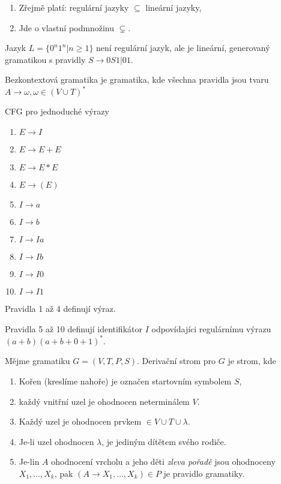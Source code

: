 \documentclass[../main.tex]{subfiles}
\begin{document}
\begin{enumerate}
    \item Zřejmě platí: regulární jazyky $\subseteq$ lineární jazyky,
    \item Jde o vlastní podmnožinu $\subsetneq$.
\end{enumerate}

\begin{example}
    Jazyk $L = \{0^n1^n | n \geq 1\}$ není regulární jazyk, ale je lineární, generovaný gramatikou s pravidly $S \rightarrow 0S1|01$.
\end{example}

\begin{definition}
    Bezkontextová gramatika je gramatika, kde všechna pravidla jsou tvaru $A \rightarrow \omega, \omega \in (V\cup T)^*$

    CFG pro jednoduché výrazy
    \begin{enumerate}
        \item $E \rightarrow I$
        \item $E \rightarrow E + E$
        \item $E \rightarrow E \ast E$
        \item $E \rightarrow (E)$
        \item $I \rightarrow a$
        \item $I \rightarrow b$
        \item $I \rightarrow Ia$
        \item $I \rightarrow Ib$
        \item $I \rightarrow I0$
        \item $I \rightarrow I1$
    \end{enumerate}

    Pravidla 1 až 4 definují výraz.

    Pravidla 5 až 10 definují identifikátor $I$ odpovídajíci regulárnímu výrazu $(a+b)(a+b+0+1)^*$.
\end{definition}

\begin{definition}
    Mějme gramatiku $G = (V,T,P,S)$. Derivační strom pro $G$ je strom, kde 
    \begin{enumerate}
        \item Kořen (kreslíme nahoře) je označen startovním symbolem $S$,
        \item každý vnitřní uzel je ohodnocen neterminálem $V$.
        \item Každý uzel je ohodnocen prvkem $\in V \cup T \cup {\lambda}$.
        \item Je-li uzel ohodnocen $\lambda$, je jediným dítětem svého rodiče.
        \item Je-lin $A$ ohodnocení vrcholu a jeho děti \textit{zleva pořadě} jsou ohodnoceny 
        $X_1,\dots, X_k$, pak $(A \rightarrow X_1, \dots, X_k)\in P$ je pravidlo gramatiky.
    \end{enumerate}
\end{definition}
\end{document}

